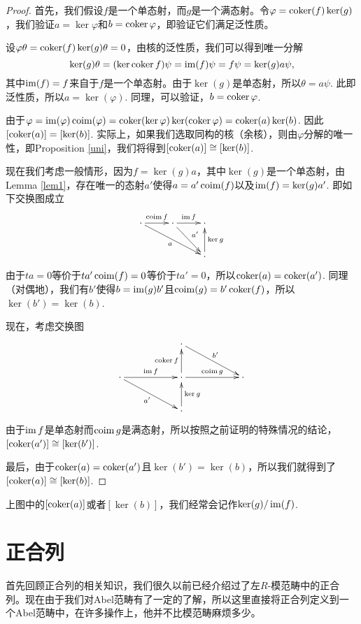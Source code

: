 \begin{proof}
首先，我们假设$f$是一个单态射，而$g$是一个满态射。令$\varphi=\operatorname{coker} (f) \ker (g)$，我们验证$a=\ker \varphi$和$b=\operatorname{coker} \varphi$，即验证它们满足泛性质。

设$\varphi \theta=\operatorname{coker} (f)\ker(g)\theta=0$，由核的泛性质，我们可以得到唯一分解
\[
	\ker(g)\theta=(\ker \operatorname{coker} f)\psi=\operatorname{im}(f)\psi=f\psi=\ker(g)a\psi,
\]
其中$\operatorname{im}(f)=f$来自于$f$是一个单态射。由于$\ker(g)$是单态射，所以$\theta=a\psi$. 此即泛性质，所以$a=\ker(\varphi)$. 同理，可以验证，$b=\operatorname{coker} \varphi$.

由于$\varphi=\operatorname{im}(\varphi)\operatorname{coim}(\varphi)=\operatorname{coker}(\ker \varphi)\ker(\operatorname{coker} \varphi)=\operatorname{coker}(a)\ker(b)$. 因此$[\operatorname{coker}(a)]=[\ker(b)]$. 实际上，如果我们选取同构的核（余核），则由$\varphi$分解的唯一性，即Proposition \ref{uni}，我们将得到$[\operatorname{coker}(a)]\cong [\ker(b)]$.

现在我们考虑一般情形，因为$f=\ker(g)a$，其中$\ker(g)$是一个单态射，由Lemma \ref{lem1}，存在唯一的态射$a'$使得$a=a'\operatorname{coim}(f)$以及$\operatorname{im}(f)=\ker(g)a'$. 即如下交换图成立
\[
\begin{xy}
	\xymatrix{
	\cdot \ar[r]^{\coim f} \ar[rrd]_a&\cdot \ar[r]^{\im f} \ar[rd]^{a'}&\cdot \\
	&&\cdot \ar[u]_{\ker g}
	}
\end{xy}
\]
由于$ta=0$等价于$ta'\operatorname{coim}(f)=0$等价于$ta'=0$，所以$\operatorname{coker}(a)=\operatorname{coker}(a')$. 同理（对偶地），我们有$b'$使得$b=\operatorname{im}(g)b'$且$\operatorname{coim}(g)=b' \operatorname{coker}(f)$，所以$\ker(b')=\ker(b)$.

现在，考虑交换图
\[
\begin{xy}
	\xymatrix{
	&&\cdot \ar[rrd]^{b'}&&\\
	\cdot \ar[rr]^{\im f} \ar[rrd]_{a'}&&\cdot \ar[rr]^{\coim g}\ar[u]^{\coker f}&&\cdot\\
	&&\cdot \ar[u]_{\ker g}&&
	}
\end{xy}
\]
由于$\operatorname{im} f$是单态射而$\operatorname{coim} g$是满态射，所以按照之前证明的特殊情况的结论，$[\operatorname{coker}(a')]\cong [\ker(b')]$. 

最后，由于$\operatorname{coker}(a)=\operatorname{coker}(a')$且$\ker(b')=\ker(b)$，所以我们就得到了$[\operatorname{coker}(a)]\cong [\ker(b)]$.
\end{proof}

上图中的$[\operatorname{coker}(a)]$或者$[\ker(b)]$，我们经常会记作$\ker(g)/\operatorname{im}(f)$.


\section{正合列}

首先回顾正合列的相关知识，我们很久以前已经介绍过了左$R$-模范畴中的正合列。现在由于我们对Abel范畴有了一定的了解，所以这里直接将正合列定义到一个Abel范畴中，在许多操作上，他并不比模范畴麻烦多少。

